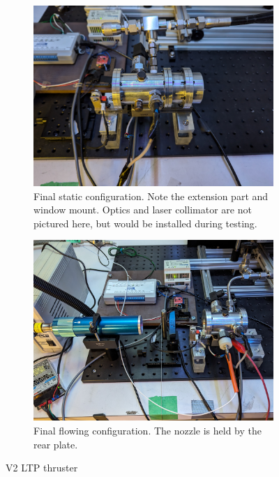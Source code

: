             \begin{figure}[!ht]
                \centering
                \begin{subfigure}[t]{0.45\textwidth}
                    \centering
                    \includegraphics[width=\textwidth]{assets/3 design/V2 Static configuration.jpg}
                    \caption{Final static configuration. Note the extension part and window mount. Optics and laser collimator are not pictured here, but would be installed during testing.}
                \end{subfigure}
                \hfill
                \begin{subfigure}[t]{0.45\textwidth}
                    \centering
                    \includegraphics[width=\textwidth]{assets/3 design/V2 flowing setup.jpg}
                    \caption{Final flowing configuration. The nozzle is held by the rear plate.}
                \end{subfigure}
                \caption{V2 LTP thruster}
                \label{fig:V2 setup}
            \end{figure}

